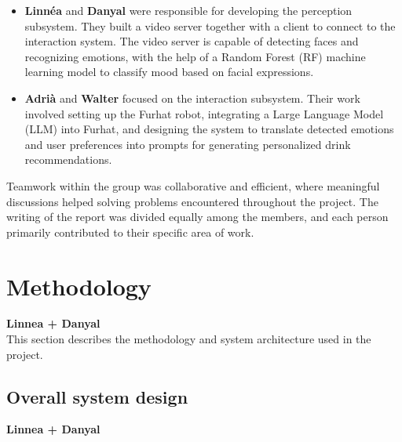 \documentclass[conference]{IEEEtran}
\begin{document}
\begin{itemize}
    \item \textbf{Linnéa} and \textbf{Danyal} were responsible for developing the perception subsystem. They built a video server together with a client to connect to the interaction system. The video server is capable of detecting faces and recognizing emotions, with the help of a Random Forest (RF) machine learning model to classify mood based on facial expressions.
    
    
    \item \textbf{Adrià} and \textbf{Walter} focused on the interaction subsystem. Their work involved setting up the Furhat robot, integrating a Large Language Model (LLM) into Furhat, and designing the system to translate detected emotions and user preferences into prompts for generating personalized drink recommendations.

\end{itemize}

Teamwork within the group was collaborative and efficient, where meaningful discussions helped solving problems encountered throughout the project. The writing of the report was divided equally among the members, and each person primarily contributed to their specific area of work.
\\
\section{Methodology}
\textbf{Linnea + Danyal}
\\
This section describes the methodology and system architecture used in the project.

\subsection{Overall system design}
\textbf{Linnea + Danyal}
\end{document}
